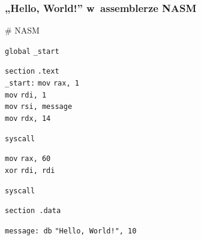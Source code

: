 \documentclass[10pt,t]{beamer}
\begin{document}
\begin{frame}
  \frametitle{„Hello, World!” w~assemblerze NASM
    \parencite{Toal-NASM-Tutorial-Ver-2024}}


  \# NASM

  \hphantom{aaaaaaaaa} \texttt{global} \hphantom{aa} \texttt{\_start} \\
  \vspace{0.8em}

  \hphantom{aaaaaaaaa} \texttt{section} \hphantom{a} \texttt{.text} \\
  \texttt{\_start:} \hphantom{a} \texttt{mov} \hphantom{aaaaaa}
  \texttt{rax, 1} \\
  \hphantom{aaaaaaaaa} \texttt{mov} \hphantom{aaaaaa} \texttt{rdi, 1} \\
  \hphantom{aaaaaaaaa} \texttt{mov} \hphantom{aaaaaa}
  \texttt{rsi, message} \\
  \hphantom{aaaaaaaaa} \texttt{mov} \hphantom{aaaaaa} \texttt{rdx, 14} \\
  \vspace{0.8em}

  \hphantom{aaaaaaaaa} \texttt{syscall} \\
  \vspace{0.8em}

  \hphantom{aaaaaaaaa} \texttt{mov} \hphantom{aaaaaa} \texttt{rax, 60} \\
  \hphantom{aaaaaaaaa} \texttt{xor} \hphantom{aaaaaa} \texttt{rdi, rdi} \\
  \vspace{0.8em}

  \hphantom{aaaaaaaaa} \texttt{syscall} \\
  \vspace{0.8em}

  \hphantom{aaaaaaaaa} \texttt{section .data} \\
  \vspace{0.8em}

  \texttt{message: db} \hphantom{aaaaa} \texttt{"Hello, World!", 10}

\end{frame}
\end{document}
